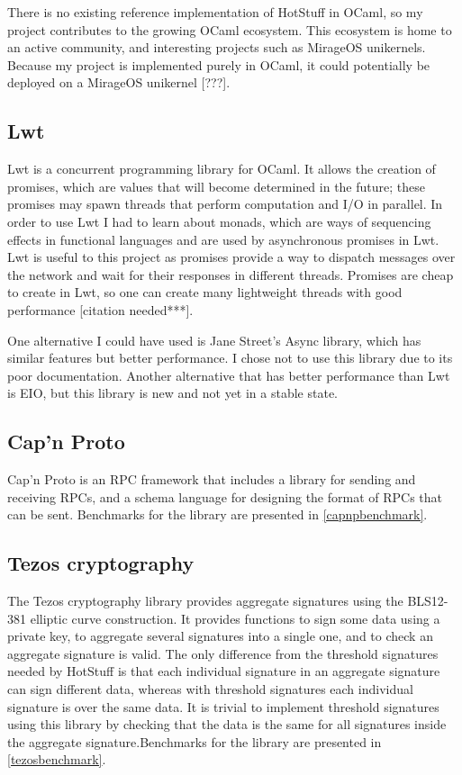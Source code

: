 There is no existing reference implementation of HotStuff in OCaml, so my project contributes to the growing OCaml ecosystem. This ecosystem is home to an active community, and interesting projects such as MirageOS unikernels. Because my project is implemented purely in OCaml, it could potentially be deployed on a MirageOS unikernel [???].

\subsection{Lwt}
Lwt is a concurrent programming library for OCaml. It allows the creation of promises, which are values that will become determined in the future; these promises may spawn threads that perform computation and I/O in parallel. In order to use Lwt I had to learn about monads, which are ways of sequencing effects in functional languages and are used by asynchronous promises in Lwt. Lwt is useful to this project as promises provide a way to dispatch messages over the network and wait for their responses in different threads. Promises are cheap to create in Lwt, so one can create many lightweight threads with good performance [citation needed***].

One alternative I could have used is Jane Street's Async library, which has similar features but better performance. I chose not to use this library due to its poor documentation. Another alternative that has better performance than Lwt is EIO, but this library is new and not yet in a stable state.

\subsection{Cap'n Proto}
Cap'n Proto is an RPC framework that includes a library for sending and receiving RPCs, and a schema language for designing the format of RPCs that can be sent. Benchmarks for the library are presented in \ref{capnpbenchmark}.

\subsection{Tezos cryptography} \label{tezos}
The Tezos cryptography library provides aggregate signatures using the BLS12-381 elliptic curve construction. It provides functions to sign some data using a private key, to aggregate several signatures into a single one, and to check an aggregate signature is valid. The only difference from the threshold signatures needed by HotStuff is that each individual signature in an aggregate signature can sign different data, whereas with threshold signatures each individual signature is over the same data. It is trivial to implement threshold signatures using this library by checking that the data is the same for all signatures inside the aggregate signature.Benchmarks for the library are presented in \ref{tezosbenchmark}.

